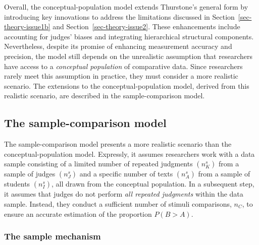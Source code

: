 \documentclass[
  authoryear,
  review,
  1p]{elsarticle}
\begin{document}
Overall, the conceptual-population model extends Thurstone's general
form by introducing key innovations to address the limitations discussed
in Section~\ref{sec-theory-issue1b} and Section~\ref{sec-theory-issue2}.
These enhancements include accounting for judges' biases and integrating
hierarchical structural components. Nevertheless, despite its promise of
enhancing measurement accuracy and precision, the model still depends on
the unrealistic assumption that researchers have access to a
\emph{conceptual population} of comparative data. Since researchers
rarely meet this assumption in practice, they must consider a more
realistic scenario. The extensions to the conceptual-population model,
derived from this realistic scenario, are described in the
sample-comparison model.

\subsection{The sample-comparison
model}\label{sec-theory-theoretical_SC}

The sample-comparison model presents a more realistic scenario than the
conceptual-population model. Expressly, it assumes researchers work with
a data sample consisting of a limited number of repeated judgments
\((n^{s}_{K})\) from a sample of judges \((n^{s}_{J})\) and a specific
number of texts \((n^{s}_{A})\) from a sample of students
\((n^{s}_{I})\), all drawn from the conceptual population. In a
subsequent step, it assumes that judges do not perform \emph{all
repeated judgments} within the data sample. Instead, they conduct a
sufficient number of stimuli comparisons, \(n_{C}\), to ensure an
accurate estimation of the proportion \(P(B>A)\).

\subsubsection{The sample mechanism}\label{sec-theory-theoretical_SC1}
\end{document}
